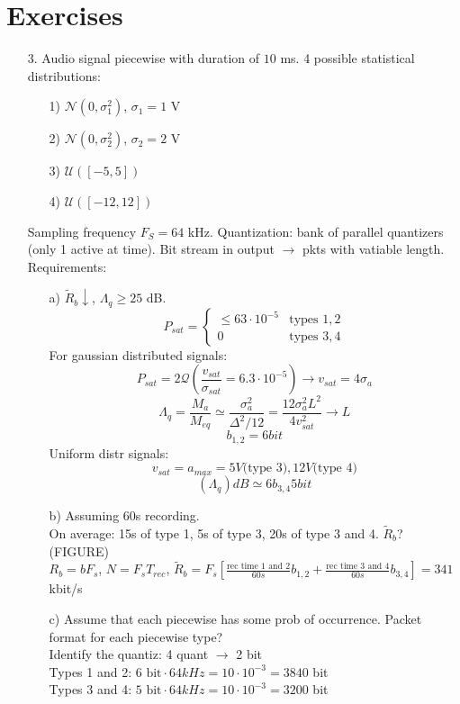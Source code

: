 \section{Exercises}
\begin{itemize}
  \item[3.] Audio signal piecewise with duration of $10$ ms. 4 possible statistical distributions:
          \begin{itemize}
            \item[1)] $\mathcal{N}(0, \sigma_1^2)$, $\sigma_1 = 1$ V
            \item[2)] $\mathcal{N}(0, \sigma_2^2)$, $\sigma_2 = 2$ V
            \item[3)] $\mathcal{U}([-5, 5])$
            \item[4)] $\mathcal{U}([-12, 12])$
          \end{itemize}
          Sampling frequency $F_S = 64$ kHz. Quantization: bank of parallel quantizers (only 1 active at time).  Bit stream in output $\rightarrow$ pkts with vatiable length. Requirements:
          \begin{itemize}
            \item[a)] $\tilde{R}_b \downarrow$, $\Lambda_q \geq 25$ dB.\\
            \begin{equation}
                P_{sat} =
            \begin{cases}
              \leq 63 \cdot 10^{-5} & \textrm{types } 1, 2 \\
              0  & \textrm{types } 3, 4
            \end{cases}
          \end{equation}
            For gaussian distributed signals: $$P_{sat} = 2\mathcal{Q}(\frac{v_{sat}}{\sigma_{sat}} = 6.3 \cdot 10^{-5}) \rightarrow v_{sat} = 4\sigma_a$$
            $$\Lambda_q = \frac{M_a}{M_{eq}} \simeq \frac{\sigma_a^2}{\Delta^2/12} = \frac{12\sigma_a^2L^2}{4v_{sat}^2} \rightarrow L$$
            $$b_{1,2} = 6 bit$$
            Uniform distr signals:
            $$v_{sat} = a_{max} = 5 V \textrm{(type 3)}, 12 V \textrm{(type 4)}$$
            $$(\Lambda_q)dB \simeq 6b_{3,4} 5 bit$$
            \item[b)] Assuming 60s recording.\\
            On average: 15s of type 1, 5s of type 3, 20s of type 3 and 4. $\tilde{R}_b$? (FIGURE)\\
            $R_b = bF_s$, $N = F_s T_{rec}$, $\tilde{R}_b = F_s[\frac{\textrm{rec time 1 and 2}}{60s}b_{1,2}+\frac{\textrm{rec time 3 and 4}}{60s}b_{3,4}] = 341$ kbit/s
            \item[c)] Assume that each piecewise has some prob of occurrence. Packet format for each piecewise type?\\
            Identify the quantiz: 4 quant $\rightarrow$ 2 bit\\
            Types 1 and 2: $6 \textrm{ bit} \cdot 64 kHz = 10 \cdot 10^{-3} = 3840$ bit\\
            Types 3 and 4: $5 \textrm{ bit} \cdot 64 kHz = 10 \cdot 10^{-3} = 3200$ bit\\

          \end{itemize}
\end{itemize}
